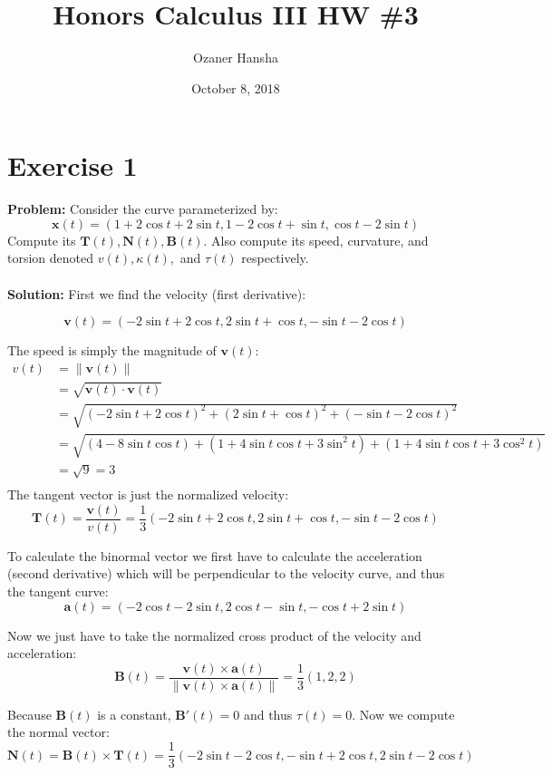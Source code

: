 \documentclass{article}
\begin{document}
\title{Honors Calculus III HW \#3}
\author{Ozaner Hansha}
\date{October 8, 2018}
\maketitle

\section*{Exercise 1}
\textbf{Problem:} Consider the curve parameterized by:
$$\mathbf x(t)=(1+2\cos t+2\sin t,1-2\cos t+\sin t,\cos t-2\sin t)$$
Compute its $\mathbf T(t), \mathbf N(t), \mathbf B(t)$. Also compute its speed, curvature, and torsion denoted $v(t), \kappa(t),$ and $\tau(t)$ respectively.
\\\\
\textbf{Solution:} First we find the velocity (first derivative):

$$\mathbf v(t)=(-2\sin t+2\cos t, 2\sin t+\cos t, -\sin t-2\cos t)$$

The speed is simply the magnitude of $\mathbf v(t)$:
\begin{align*}
v(t)&=\|\mathbf v(t)\|\\
&=\sqrt{\mathbf v(t)\cdot\mathbf v(t)}\\
&=\sqrt{(-2\sin t+2\cos t)^2+(2\sin t+\cos t)^2+(-\sin t-2\cos t)^2}\\
&=\sqrt{(4-8\sin t\cos t)+(1+4\sin t\cos t+3\sin^2 t)+(1+4\sin t\cos t+3\cos^2 t)}\\
&=\sqrt{9}=3\\
\end{align*}
The tangent vector is just the normalized velocity:
$$\mathbf T(t)=\frac{\mathbf v(t)}{v(t)}=\frac{1}{3}(-2\sin t+2\cos t, 2\sin t+\cos t, -\sin t-2\cos t)$$

To calculate the binormal vector we first have to calculate the acceleration (second derivative) which will be perpendicular to the velocity curve, and thus the tangent curve:
$$\mathbf a(t)=(-2\cos t-2\sin t,2\cos t-\sin t,-\cos t+2\sin t)$$

Now we just have to take the normalized cross product of the velocity and acceleration:
$$\mathbf B(t)=\frac{\mathbf v(t)\times\mathbf a(t)}{\|\mathbf v(t)\times\mathbf a(t)\|}=\frac{1}{3}(1,2,2)$$

Because $\mathbf B(t)$ is a constant, $\mathbf B'(t)=0$ and thus $\tau(t)=0$. Now we compute the normal vector:
$$\mathbf N(t)=\mathbf B(t)\times\mathbf T(t)=\frac{1}{3}(-2\sin t-2\cos t, -\sin t+2\cos t, 2\sin t-2\cos t)$$
\end{document}
